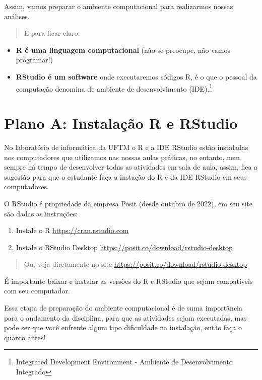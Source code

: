 \documentclass[
]{book}
\begin{document}
Assim, vamos preparar o ambiente computacional para realizarmos nossas análises.

\begin{quote}
E para ficar claro:
\end{quote}

\begin{itemize}
\item
  \textbf{R é uma linguagem computacional} (não se preocupe, não vamos programar!)
\item
  \textbf{RStudio é um software} onde executaremos códigos R, é o que o pessoal da computação denomina de ambiente de desenvolvimento (IDE).\footnote{Integrated Development Environment - Ambiente de Desenvolvimento Integrado}
\end{itemize}

\hypertarget{plano-a-instalauxe7uxe3o-r-e-rstudio}{%
\section{Plano A: Instalação R e RStudio}\label{plano-a-instalauxe7uxe3o-r-e-rstudio}}

No laboratório de informática da UFTM o R e a IDE RStudio estão instaladas nos computadores que utilizamos nas nossas aulas práticas, no entanto, nem sempre há tempo de desenvolver todas as atividades em sala de aula, assim, fica a sugestão para que o estudante faça a instação do R e da IDE RStudio em seus computadores.

O RStudio é propriedade da empresa Posit (desde outubro de 2022), em seu site são dadas as instruções:

\begin{enumerate}
\def\labelenumi{\arabic{enumi}.}
\item
  Instale o R \url{https://cran.rstudio.com}
\item
  Instale o RStudio Desktop \url{https://posit.co/download/rstudio-desktop}
\end{enumerate}

\begin{quote}
Ou, veja diretamente no site \url{https://posit.co/download/rstudio-desktop}
\end{quote}

É importante baixar e instalar as versões do R e RStudio que sejam compatíveis com seu computador.

Essa etapa de preparação do ambiente computacional é de suma importância para o andamento da disciplina, para que as atividades sejam executadas, mas pode ser que você enfrente algum tipo dificuldade na instalação, então faça o quanto antes!
\end{document}
